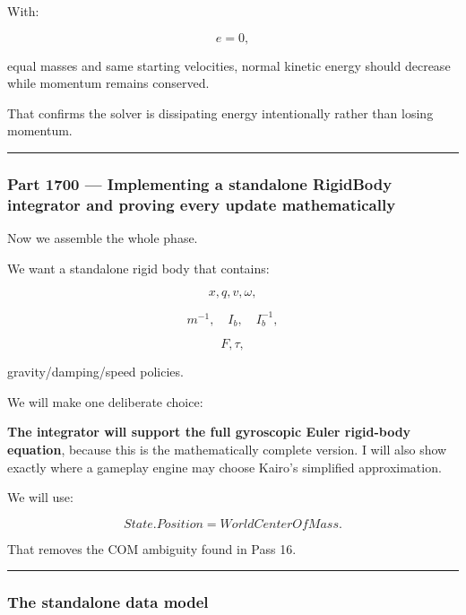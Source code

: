 With:

\[
e=0,
\]

equal masses and same starting velocities, normal kinetic energy should decrease while momentum remains conserved.

That confirms the solver is dissipating energy intentionally rather than losing momentum.

\begin{center}\rule{0.5\linewidth}{0.5pt}\end{center}

\subsubsection{Part 1700 --- Implementing a standalone RigidBody integrator and proving every update mathematically}\label{part-1700-implementing-a-standalone-rigidbody-integrator-and-proving-every-update-mathematically}

Now we assemble the whole phase.

We want a standalone rigid body that contains:

\[
x,q,v,\omega,
\]

\[
m^{-1},
\quad
I_b,
\quad
I_b^{-1},
\]

\[
F,\tau,
\]

gravity/damping/speed policies.

We will make one deliberate choice:

\textbf{The integrator will support the full gyroscopic Euler rigid-body equation}, because this is the mathematically complete version. I will also show exactly where a gameplay engine may choose Kairo's simplified approximation.

We will use:

\[
State.Position
=
WorldCenterOfMass.
\]

That removes the COM ambiguity found in Pass 16.

\begin{center}\rule{0.5\linewidth}{0.5pt}\end{center}

\subsubsection{The standalone data model}\label{the-standalone-data-model}

